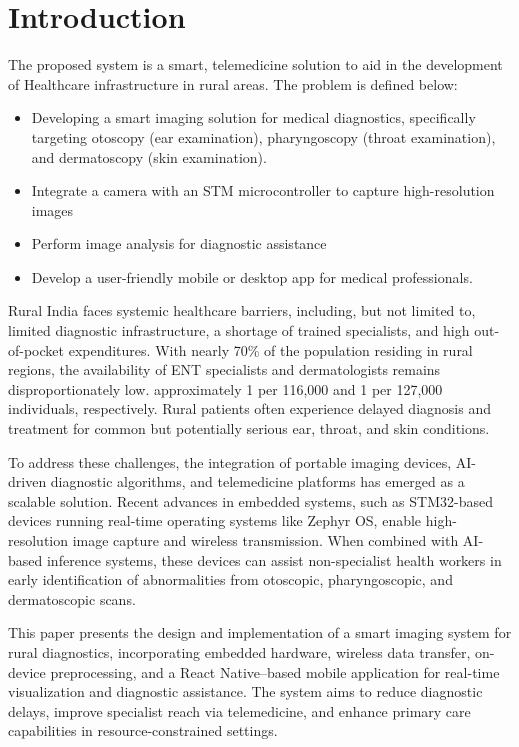 \chapter{Introduction}
The proposed system is a smart, telemedicine solution to aid in the development of Healthcare infrastructure in rural areas. The problem is defined below:
\begin{itemize}
\item Developing a smart imaging solution for medical diagnostics, specifically targeting otoscopy (ear examination), pharyngoscopy (throat examination), and dermatoscopy (skin examination). 
\item Integrate a camera with an STM microcontroller to capture high-resolution images
\item Perform image analysis for diagnostic assistance
\item Develop a user-friendly mobile or desktop app for medical professionals.
\end{itemize}
Rural India faces systemic healthcare barriers, including, but not limited to, limited diagnostic infrastructure, a shortage of trained specialists, and high out-of-pocket expenditures. With nearly 70\% of the population residing in rural regions, the availability of ENT specialists and dermatologists remains disproportionately low. approximately 1 per 116,000 and 1 per 127,000 individuals, respectively. Rural patients often experience delayed diagnosis and treatment for common but potentially serious ear, throat, and skin conditions.\par
To address these challenges, the integration of portable imaging devices, AI-driven diagnostic algorithms, and telemedicine platforms has emerged as a scalable solution. Recent advances in embedded systems, such as STM32-based devices running real-time operating systems like Zephyr OS, enable high-resolution image capture and wireless transmission. When combined with AI-based inference systems, these devices can assist non-specialist health workers in early identification of abnormalities from otoscopic, pharyngoscopic, and dermatoscopic scans.\par
This paper presents the design and implementation of a smart imaging system for rural diagnostics, incorporating embedded hardware, wireless data transfer, on-device preprocessing, and a React Native–based mobile application for real-time visualization and diagnostic assistance. The system aims to reduce diagnostic delays, improve specialist reach via telemedicine, and enhance primary care capabilities in resource-constrained settings. \par
